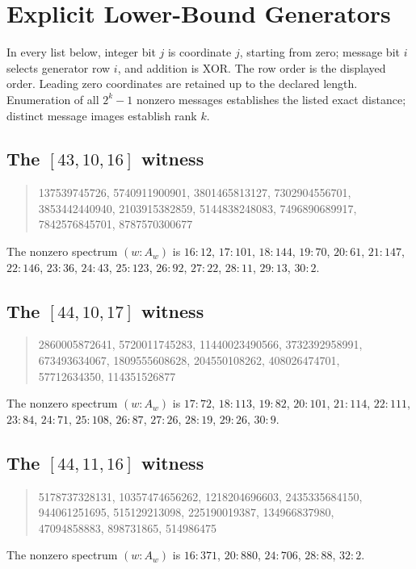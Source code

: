 \section{Explicit Lower-Bound Generators}
\label{app:lower}
In every list below, integer bit $j$ is coordinate $j$, starting from zero; message bit $i$ selects generator row $i$, and addition is XOR. The row order is the displayed order. Leading zero coordinates are retained up to the declared length. Enumeration of all $2^k-1$ nonzero messages establishes the listed exact distance; distinct message images establish rank $k$.

\subsection{The $[43,10,16]$ witness}
\begin{quote}\ttfamily\small
137539745726, 5740911900901, 3801465813127, 7302904556701,\\
3853442440940, 2103915382859, 5144838248083, 7496890689917,\\
7842576845701, 8787570300677
\end{quote}
The nonzero spectrum $(w:A_w)$ is $16:12$, $17:101$, $18:144$, $19:70$, $20:61$, $21:147$, $22:146$, $23:36$, $24:43$, $25:123$, $26:92$, $27:22$, $28:11$, $29:13$, $30:2$.

\subsection{The $[44,10,17]$ witness}
\begin{quote}\ttfamily\small
2860005872641, 5720011745283, 11440023490566, 3732392958991,\\
673493634067, 1809555608628, 204550108262, 408026474701,\\
57712634350, 114351526877
\end{quote}
The nonzero spectrum $(w:A_w)$ is $17:72$, $18:113$, $19:82$, $20:101$, $21:114$, $22:111$, $23:84$, $24:71$, $25:108$, $26:87$, $27:26$, $28:19$, $29:26$, $30:9$.

\subsection{The $[44,11,16]$ witness}
\begin{quote}\ttfamily\small
5178737328131, 10357474656262, 1218204696603, 2435335684150,\\
944061251695, 515129213098, 225190019387, 134966837980,\\
47094858883, 898731865, 514986475
\end{quote}
The nonzero spectrum $(w:A_w)$ is $16:371$, $20:880$, $24:706$, $28:88$, $32:2$.

